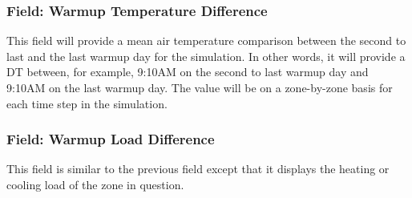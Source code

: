 \subsubsection{Field: Warmup Temperature Difference}

This field will provide a mean air temperature comparison between the second to last and the last warmup day for the simulation.  In other words, it will provide a DT between, for example, 9:10AM on the second to last warmup day and 9:10AM on the last warmup day. The value will be on a zone-by-zone basis for each time step in the simulation.

\subsubsection{Field: Warmup Load Difference}

This field is similar to the previous field except that it displays the heating or cooling load of the zone in question.
